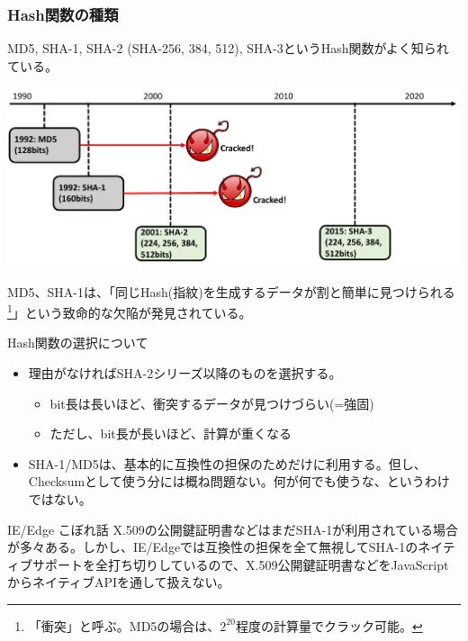 \documentclass[12pt,dvipdfmx]{beamer}
\begin{document}
\begin{frame}
\frametitle{Hash関数の種類}
 MD5, SHA-1, SHA-2 (SHA-256, 384, 512), SHA-3というHash関数がよく知られている。
 \begin{center}
  \includegraphics[width=\linewidth]{Figs/hash-history.pdf}
 \end{center}
 MD5、SHA-1は、「\alert{同じHash(指紋)を生成するデータが割と簡単に見つけられる}\footnote[frame]{「衝突」と呼ぶ。MD5の場合は、$2^{20}$程度の計算量でクラック可能。}」という致命的な欠陥が発見されている。
\end{frame}

\begin{frame}
\begin{block}{\small Hash関数の選択について}
\begin{itemize}
 \item 理由がなければSHA-2シリーズ以降のものを選択する。
\begin{itemize}
 \item bit長は長いほど、衝突するデータが見つけづらい(=強固)
 \item ただし、bit長が長いほど、計算が重くなる
\end{itemize}
 \item SHA-1/MD5は、基本的に互換性の担保のためだけに利用する。但し、Checksumとして使う分には概ね問題ない。\alert{何が何でも使うな、というわけではない。}
\end{itemize}
\end{block}

\begin{exampleblock}{\small IE/Edge こぼれ話}
\small
X.509の公開鍵証明書などはまだSHA-1が利用されている場合が多々ある。しかし、\alert{IE/Edgeでは互換性の担保を全て無視してSHA-1のネイティブサポートを全打ち切り}しているので、X.509公開鍵証明書などをJavaScriptからネイティブAPIを通して扱えない。
\end{exampleblock}
\end{frame}
\end{document}
